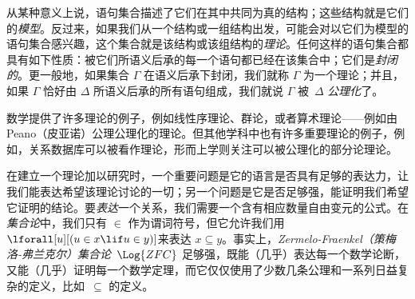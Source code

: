 从某种意义上说，语句集合描述了它们在其中共同为真的结构；这些结构就是它们的\emph{模型}。反过来，如果我们从一个结构或一组结构出发，可能会对以它们为模型的语句集合感兴趣，这个集合就是该结构或该组结构的\emph{理论}。任何这样的语句集合都具有如下性质：被它们所语义后承的每一个语句都已经在该集合中；它们是\emph{封闭的}。更一般地，如果集合 $\Gamma$ 在语义后承下封闭，我们就称 $\Gamma$ 为一个理论；并且，如果 $\Gamma$ 恰好由 $\Delta$ 所语义后承的所有语句组成，我们就说 $\Gamma$ 被~$\Delta$ \emph{公理化}了。

数学提供了许多理论的例子，例如线性序理论、群论，或者算术理论——例如由 Peano（皮亚诺）公理公理化的理论。但其他学科中也有许多重要理论的例子，例如，关系数据库可以被看作理论，形而上学则关注可以被公理化的部分论理论。

在建立一个理论加以研究时，一个重要问题是它的语言是否具有足够的表达力，让我们能表达希望该理论讨论的一切；另一个问题是它是否足够强，能证明我们希望它证明的结论。要\emph{表达}一个关系，我们需要一个含有相应数量自由变元的公式。在\emph{集合论}中，我们只有 $\in$ 作为谓词符号，但它允许我们用$\lforall[u][(u \in x \lif u \in y)]$来表达 $x \subseteq y$。事实上，\emph{Zermelo-Fraenkel（策梅洛-弗兰克尔）集合论}~$\Log{ZFC}$ 足够强，既能（几乎）表达每一个数学论断，又能（几乎）证明每一个数学定理，而它仅仅使用了少数几条公理和一系列日益复杂的定义，比如~$\subseteq$ 的定义。